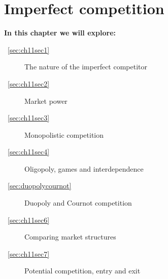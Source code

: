 \chapter{Imperfect competition} \label{chap:imperfectcompetition}

\begin{topics}
\textbf{In this chapter we will explore:}
\begin{description}
\item [~\ref{sec:ch11sec1}] The nature of the imperfect competitor
\item [~\ref{sec:ch11sec2}] Market power
\item [~\ref{sec:ch11sec3}] Monopolistic competition
\item [~\ref{sec:ch11sec4}] Oligopoly, games and interdependence
\item [~\ref{sec:duopolycournot}] Duopoly and Cournot competition
\item [~\ref{sec:ch11sec6}] Comparing market structures
\item [~\ref{sec:ch11sec7}] Potential competition, entry and exit
\end{description}
\end{topics}